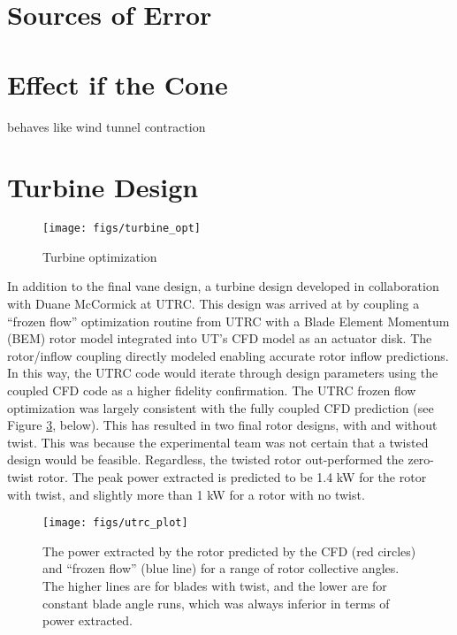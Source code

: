 \section{Sources of Error}

\section{Effect if the Cone}

behaves like wind tunnel contraction

\section{Turbine Design}

  \begin{figure}[!htb]
   \begin{center}
    \texttt{[image: figs/turbine\_opt]}
    \caption{Turbine optimization}
    \label{fig:ut_turbine}
   \end{center}
  \end{figure}

In addition to the final vane design, a turbine design developed in
collaboration with Duane McCormick at UTRC. This design was arrived at
by coupling a ``frozen flow'' optimization routine from UTRC with a Blade
Element Momentum (BEM) rotor model integrated into UT's CFD model as an
actuator disk. The rotor/inflow coupling directly modeled enabling
accurate rotor inflow predictions. In this way, the UTRC code would
iterate through design parameters using the coupled CFD code as a higher
fidelity confirmation. The UTRC frozen flow optimization was largely
consistent with the fully coupled CFD prediction (see Figure \ref{},
below). This has resulted in two final rotor designs, with and without
twist. This was because the experimental team was not certain that a
twisted design would be feasible. Regardless, the twisted rotor
out-performed the zero-twist rotor. The peak power extracted is
predicted to be 1.4 kW for the rotor with twist, and slightly more than
1 kW for a rotor with no twist. 

  \begin{figure}[!htb]
   \begin{center}
    \texttt{[image: figs/utrc\_plot]}
    \caption{The power extracted by the rotor predicted by the CFD (red
    circles) and ``frozen flow'' (blue line) for a range of rotor
    collective angles. The higher lines are for blades with twist, and
    the lower are for constant blade angle runs, which was always
    inferior in terms of power extracted.}
    \label{fig:UTRC_turbine}
   \end{center}
  \end{figure}


